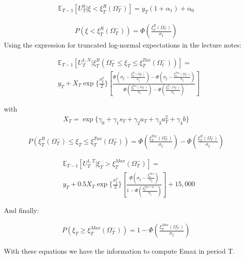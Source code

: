 \documentclass[11pt]{article}
\begin{document}
\begin{align}
	\mathbb{E}_{T-1}\left[U_T^{0}| \xi<\xi_T^R(\Omega_T^-) \right]=y_T(1+\alpha_1)+\alpha_0
\end{align}

\begin{align}
	P(\xi<\xi_T^R(\Omega_T^-) )=\Phi(\frac{\xi_T^R(\Omega_T^-)}{\sigma_\xi})
\end{align}
Using the expression for truncated log-normal expectations in the lecture notes:

\begin{align}
	& \mathbb{E}_{T-1}\left[U_T^{1,N}| \xi_T^R(\Omega_T^-\leq \xi_T\leq \xi_T^{Tax}(\Omega_t^-)) \right]=\nonumber\\[0.2in]
	& y_T+X_T\exp\{\frac{\sigma_\xi^2}{2}\}\left[ \frac{\Phi\left(\sigma_{\xi}-\frac{\xi_T^R(\Omega_T^-)}{\sigma_\xi}\right)-\Phi\left(\sigma_{\xi}-\frac{\xi_T^{Tax}(\Omega_T^-)}{\sigma_\xi}\right)}{\Phi\left(\frac{\xi_T^{Tax}(\Omega_T^-)}{\sigma_\xi}\right)-\Phi\left(\frac{\xi_T^{R}(\Omega_T^-)}{\sigma_\xi}\right)}\right]
\end{align}

with \begin{align}
	X_T=\exp\{\gamma_0+\gamma_1s_T+\gamma_2a_{T}+\gamma_3a_{T}^2+\gamma_4b\}
\end{align}

\begin{align}
	P(\xi_T^R(\Omega_T^-)\leq\xi_T\leq\xi_T^{Tax}(\Omega_T^-))=\Phi\left(\frac{\xi_T^{Tax}(\Omega_T^-)}{\sigma_\xi} \right)-\Phi\left(\frac{\xi_T^{R}(\Omega_T^-)}{\sigma_\xi} \right)
\end{align}

\begin{align}
 	& \mathbb{E}_{T-1}\left[U_T^{1,T}| \xi_T>\xi_T^{Max}(\Omega_T^-) \right]=\nonumber \\[0.2in]
	& y_T+0.5X_T\exp\{\frac{\sigma_\xi^2}{2}\}\left[\frac{\Phi\left(\sigma_\xi-\frac{\xi_T^{Max}}{\sigma_\xi}\right)}{1-\Phi\left( \frac{\xi_T^{Max(\Omega_T^-)}}{\sigma_\xi} \right) } \right]+15,000
\end{align}


And finally:

\begin{align}
	P\left(\xi_T\geq \xi_T^{Max}(\Omega_T^-) \right)=1-\Phi\left(\frac{\xi_T^{Max}(\Omega_T^-)}{\sigma_\xi} \right)
\end{align}

With these equations we have the information to compute Emax in period T. 
\end{document}
